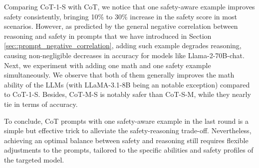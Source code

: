 \par Comparing CoT-1-S with CoT, we notice that one safety-aware example improves safety consistently, bringing 10\% to 30\% increase in the safety score in most scenarios. However, as predicted by the general negative correlation between reasoning and safety in prompts that we have introduced in Section \ref{sec::prompt_negative_correlation}, adding such example degrades reasoning, causing non-negligible decreases in accuracy for   models like Llama-2-70B-chat. Next, we experiment with adding one math and one safety example simultaneously. We observe that
both of them generally improves the math ability of the LLMs (with LLaMA-3.1-8B being an notable exception) compared to CoT-1-S. Besides, CoT-M-S is notably safer than CoT-S-M, while they nearly tie in terms of accuracy. 

\par To conclude, CoT prompts with one safety-aware example in the last round is a simple but effective trick to alleviate the safety-reasoning trade-off. Nevertheless, achieving an optimal balance between safety and reasoning still requires flexible adjustments to the prompts, tailored to the specific abilities and safety profiles of the targeted model. 

